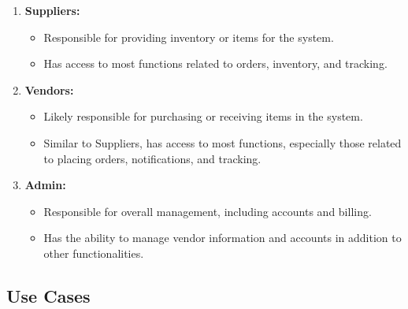 \begin{enumerate}
    \item \textbf{Suppliers:}
    \begin{itemize}
        \item Responsible for providing inventory or items for the system.
        \item Has access to most functions related to orders, inventory, and tracking.
    \end{itemize}

    \item \textbf{Vendors:}
    \begin{itemize}
        \item Likely responsible for purchasing or receiving items in the system.
        \item Similar to Suppliers, has access to most functions, especially those related to placing orders, notifications, and tracking.
    \end{itemize}

    \item \textbf{Admin:}
    \begin{itemize}
        \item Responsible for overall management, including accounts and billing.
        \item Has the ability to manage vendor information and accounts in addition to other functionalities.
    \end{itemize}
\end{enumerate}
\subsection{Use Cases}

